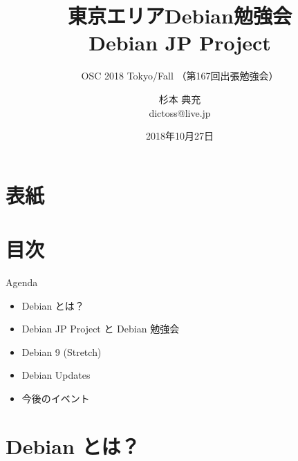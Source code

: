 \title{東京エリアDebian勉強会\\Debian JP Project}
\subtitle{OSC 2018 Tokyo/Fall （第167回出張勉強会）}
\author{杉本 典充\\ dictoss@live.jp}
\date{2018年10月27日}



\section{表紙}

\begin{frame}
\titlepage{}
\end{frame}

\section{目次}

\begin{frame}{Agenda}
  \begin{itemize}
  \item Debian とは？
  \item Debian JP Project と Debian 勉強会
  \item Debian 9 (Stretch)
  \item Debian Updates
  \item 今後のイベント
  \end{itemize}
\end{frame}


\section{Debian とは？}

